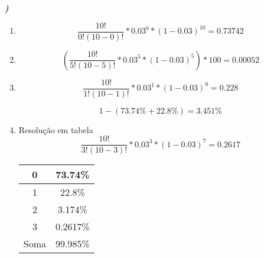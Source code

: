 \documentclass[12pt]{article}
\newcounter{instn}
\newcommand{\instnum}{\arabic{instn}}
\newcommand{\myline}[1]{
    \emph{\textbf{#1)}}
    \addtocounter{instn}{1}
}
\newenvironment{question}
 {
    \myline{\instnum} 
    }
    {
 }
\begin{document}

    \begin{question}
        \begin{enumerate}[label={\textbf{\alph*)}}]
            \item        
            \begin{equation}
                \frac{10!}{0!(10-0)!} * 0.03^{0}*(1-0.03)^{10} = 0.73742
            \end{equation}
            \item 
            \begin{equation}
                (\frac{10!}{5!(10-5)!} * 0.03^{5}*(1-0.03)^{5})*100 = 0.00052
            \end{equation}

            \item 
            \[
                \frac{10!}{1!(10-1)!} * 0.03^{1}*(1-0.03)^{9} = 0.228
            \]

            \begin{equation}
                1-(73.74\%+22.8\%) = 3.451\%
            \end{equation}

            \item Resolução em tabela
            \begin{equation}
                \frac{10!}{3!(10-3)!} * 0.03^{3}*(1-0.03)^{7} = 0.2617
            \end{equation}
            
            \begin{center}
                \begin{tabular}{||c | c||} 
                \hline
                0 & 73.74\% \\ [0.5ex] 
                \hline
                1 & 22.8\% \\ 
                \hline
                2 & 3.174\% \\
                \hline
                3 & 0.2617\% \\
                \hline
                Soma & 99.985\% \\
                \hline
               \end{tabular}
            \end{center}

        \end{enumerate}
    \end{question}
\end{document}
